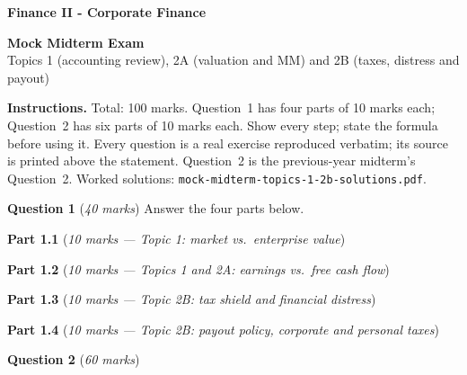 \documentclass[11pt,a4paper]{article}
\newcommand{\qpart}[2]{\par\medskip\noindent\textbf{#1} (\emph{#2})\par}
\begin{document}
\textbf{Finance II - Corporate Finance}

\begin{center}
  {\LARGE\bfseries Mock Midterm Exam}\\[4pt]
  {\large Topics 1 (accounting review), 2A (valuation and MM) and 2B (taxes, distress and payout)}
\end{center}

\noindent\textbf{Instructions.} Total: 100 marks. Question~1 has four parts of 10 marks each; Question~2
has six parts of 10 marks each. Show every step; state the formula before using it. Every question is a
real exercise reproduced verbatim; its source is printed above the statement. Question~2 is the
previous-year midterm's Question~2. Worked solutions: \texttt{mock-midterm-topics-1-2b-solutions.pdf}.

\bigskip
\noindent\textbf{Question 1} (\emph{40 marks}) Answer the four parts below.

\qpart{Part 1.1}{10 marks --- Topic 1: market vs.\ enterprise value}
\QoneA

\qpart{Part 1.2}{10 marks --- Topics 1 and 2A: earnings vs.\ free cash flow}
\QoneB

\qpart{Part 1.3}{10 marks --- Topic 2B: tax shield and financial distress}
\QoneC

\qpart{Part 1.4}{10 marks --- Topic 2B: payout policy, corporate and personal taxes}
\QoneD

\newpage
\noindent\textbf{Question 2} (\emph{60 marks})
\QtwoIntro

\medskip\QtwoA

\medskip\QtwoB

\medskip\QtwoC

\medskip\QtwoD

\medskip\QtwoE

\medskip\QtwoF
\end{document}
